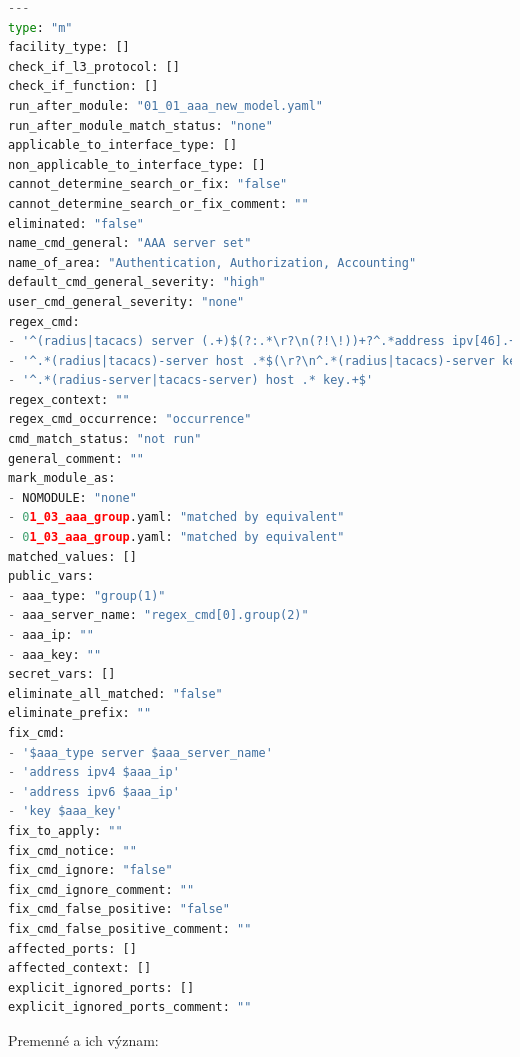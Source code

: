 \begin{lstlisting}[frame=single,numbers=right,caption={Konfiguračný súbor \texttt{01\_02\_aaa\_server.yaml}, ktorý popisuje základné informácie o~jednom konkrétnom zariadení},label=yaml:module,basicstyle=\ttfamily\small,rulecolor=\color{black}, keywordstyle=\color{black},language=python,breaklines=true]
---
type: "m"
facility_type: []
check_if_l3_protocol: []
check_if_function: []
run_after_module: "01_01_aaa_new_model.yaml"
run_after_module_match_status: "none"
applicable_to_interface_type: []
non_applicable_to_interface_type: [] 
cannot_determine_search_or_fix: "false" 
cannot_determine_search_or_fix_comment: ""
eliminated: "false" 
name_cmd_general: "AAA server set"
name_of_area: "Authentication, Authorization, Accounting"
default_cmd_general_severity: "high" 
user_cmd_general_severity: "none"
regex_cmd:
- '^(radius|tacacs) server (.+)$(?:.*\r?\n(?!\!))+?^.*address ipv[46].+$(?:\r?\n^.*key.+$)?(?:.*\r?\n)*?(?=\!)'
- '^.*(radius|tacacs)-server host .*$(\r?\n^.*(radius|tacacs)-server key.*$)?'
- '^.*(radius-server|tacacs-server) host .* key.+$'
regex_context: ""
regex_cmd_occurrence: "occurrence"
cmd_match_status: "not run"
general_comment: ""
mark_module_as:
- NOMODULE: "none"
- 01_03_aaa_group.yaml: "matched by equivalent"
- 01_03_aaa_group.yaml: "matched by equivalent"
matched_values: []
public_vars:
- aaa_type: "group(1)"
- aaa_server_name: "regex_cmd[0].group(2)"
- aaa_ip: ""
- aaa_key: ""
secret_vars: []
eliminate_all_matched: "false"
eliminate_prefix: ""
fix_cmd: 
- '$aaa_type server $aaa_server_name'
- 'address ipv4 $aaa_ip'
- 'address ipv6 $aaa_ip'
- 'key $aaa_key'
fix_to_apply: "" 
fix_cmd_notice: ""
fix_cmd_ignore: "false"
fix_cmd_ignore_comment: ""
fix_cmd_false_positive: "false"
fix_cmd_false_positive_comment: "" 
affected_ports: []
affected_context: []
explicit_ignored_ports: []
explicit_ignored_ports_comment: "" 
\end{lstlisting}
\vspace{1em}
\noindent
Premenné a ich význam:
